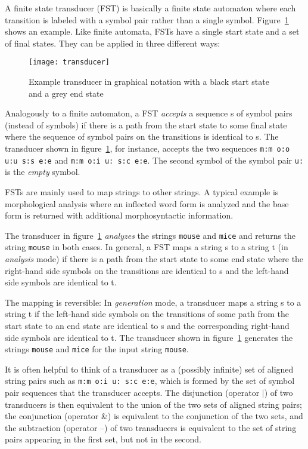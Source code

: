 \documentclass[11pt]{article}
\begin{document}
A finite state transducer (FST) is basically a finite state automaton
where each transition is labeled with a symbol pair rather than a
single symbol. Figure~\ref{fig:transducer} shows an example. Like
finite automata, FSTs have a single start state and a set of final
states. They can be applied in three different ways:

\begin{figure}[htbp]
  \centerline{\texttt{[image: transducer]}}
  \caption{Example transducer in graphical notation with a black start
    state and a grey end state}
  \label{fig:transducer}
\end{figure}

Analogously to a finite automaton, a FST \emph{accepts} a sequence s
of symbol pairs (instead of symbols) if there is a path from the start
state to some final state where the sequence of symbol pairs on the
transitions is identical to s. The transducer shown in
figure~\ref{fig:transducer}, for instance, accepts the two sequences
\texttt{m:m o:o u:u s:s e:e} and \texttt{m:m o:i u: s:c e:e}. The
second symbol of the symbol pair \texttt{u:} is the \emph{empty}
symbol.

FSTs are mainly used to map strings to other strings. A typical
example is morphological analysis where an inflected word form is
analyzed and the base form is returned with additional morphosyntactic
information.

The transducer in figure~\ref{fig:transducer} \emph{analyzes} the
strings \texttt{mouse} and \texttt{mice} and returns the string
\texttt{mouse} in both cases. In general, a FST maps a string s to a
string t (in \emph{analysis} mode) if there is a path from the start state to
some end state where the right-hand side symbols on the transitions
are identical to s and the left-hand side symbols are identical to
t.

The mapping is reversible: In \emph{generation} mode, a transducer
maps a string s to a string t if the left-hand side symbols on the
transitions of some path from the start state to an end state are
identical to s and the corresponding right-hand side symbols are
identical to t. The transducer shown in figure~\ref{fig:transducer}
generates the strings \texttt{mouse} and \texttt{mice} for the input
string \texttt{mouse}.

It is often helpful to think of a transducer as a (possibly infinite)
set of aligned string pairs such as \texttt{m:m o:i u: s:c e:e}, which
is formed by the set of symbol pair sequences that the transducer
accepts. The disjunction (operator $|$) of two transducers is then
equivalent to the union of the two sets of aligned string pairs; the
conjunction (operator \&) is equivalent to the conjunction of the two
sets, and the subtraction (operator --) of two transducers is
equivalent to the set of string pairs appearing in the first set, but
not in the second.
\end{document}
